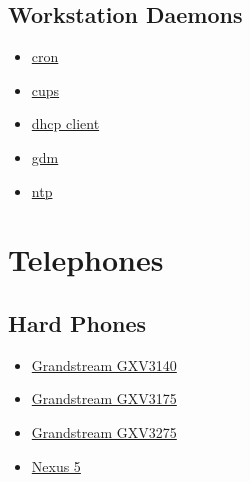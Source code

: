 \subsection{Workstation Daemons}
\begin{itemize}
\item \href{http://ftp.isc.org/isc/cron/}{cron}
\item \href{http://www.cups.org/}{cups}
\item \href{http://www.isc.org/}{dhcp client}
\item \href{https://wiki.gnome.org/Projects/GDM}{gdm}
\item \href{http://support.ntp.org/}{ntp}
\end{itemize}

\section{Telephones}
\subsection{Hard Phones}
\begin{itemize}
\item \href{https://www.grandstream.com/products/ip-video-telephony/gxv3140/}{Grandstream GXV3140}
\item \href{https://www.grandstream.com/products/ip-video-telephony/gxv3175/}{Grandstream GXV3175}
\item \href{https://www.grandstream.com/products/ip-video-telephony/gxv3275/}{Grandstream GXV3275}
\item \href{http://www.google.com/nexus/5/}{Nexus 5}
\end{itemize}

